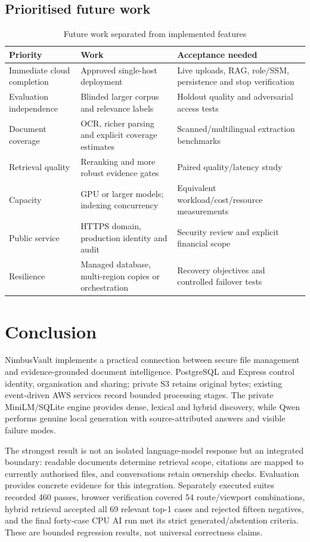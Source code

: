 \documentclass[11pt,a4paper,oneside]{report}
\begin{document}
\section{Prioritised future work}
\par\begin{table}[htbp]\caption{Future work separated from implemented features}\small\begin{tabularx}{\linewidth}{p{.28\linewidth}YY}\toprule Priority&Work&Acceptance needed\\\midrule
Immediate cloud completion&Approved single-host deployment&Live uploads, RAG, role/SSM, persistence and stop verification\\
Evaluation independence&Blinded larger corpus and relevance labels&Holdout quality and adversarial access tests\\
Document coverage&OCR, richer parsing and explicit coverage estimates&Scanned/multilingual extraction benchmarks\\
Retrieval quality&Reranking and more robust evidence gates&Paired quality/latency study\\
Capacity&GPU or larger models; indexing concurrency&Equivalent workload/cost/resource measurements\\
Public service&HTTPS domain, production identity and audit&Security review and explicit financial scope\\
Resilience&Managed database, multi-region copies or orchestration&Recovery objectives and controlled failover tests\\\bottomrule\end{tabularx}\end{table}\par
\FloatBarrier

\chapter{Conclusion}
NimbusVault implements a practical connection between secure file management and evidence-grounded document intelligence. PostgreSQL and Express control identity, organisation and sharing; private S3 retains original bytes; existing event-driven AWS services record bounded processing stages. The private MiniLM/SQLite engine provides dense, lexical and hybrid discovery, while Qwen performs genuine local generation with source-attributed answers and visible failure modes.

The strongest result is not an isolated language-model response but an integrated boundary: readable documents determine retrieval scope, citations are mapped to currently authorised files, and conversations retain ownership checks. Evaluation provides concrete evidence for this integration. Separately executed suites recorded 460 passes, browser verification covered 54 route/viewport combinations, hybrid retrieval accepted all 69 relevant top-1 cases and rejected fifteen negatives, and the final forty-case CPU AI run met its strict generated/abstention criteria. These are bounded regression results, not universal correctness claims.
\end{document}
